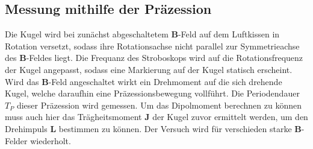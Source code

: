 \subsection{Messung mithilfe der Präzession}
Die Kugel wird bei zunächst abgeschaltetem $\symbf{B}$-Feld auf dem Luftkissen in Rotation versetzt, sodass ihre Rotationsachse nicht parallel zur Symmetrieachse des $\symbf{B}$-Feldes liegt.
Die Frequanz des Stroboskops wird auf die Rotationsfrequenz der Kugel angepasst, sodass eine Markierung auf der Kugel statisch erscheint.
Wird das $\symbf{B}$-Feld angeschaltet wirkt ein Drehmoment auf die sich drehende Kugel, welche daraufhin eine Präzessionsbewegung vollführt.
Die Periodendauer $T_P$ dieser Präzession wird gemessen.
Um das Dipolmoment berechnen zu können muss auch hier das Trägheitsmoment $\symbf{J}$ der Kugel zuvor ermittelt werden,
um den Drehimpuls $\symbf{L}$ bestimmen zu können.
Der Versuch wird für verschieden starke $\symbf{B}$-Felder wiederholt.

